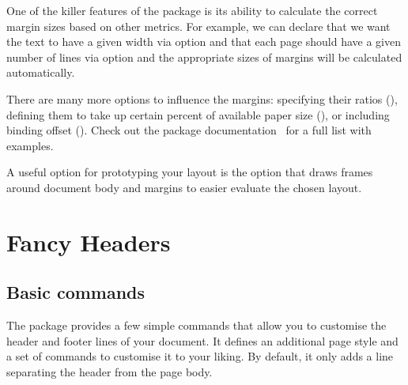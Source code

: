 One of the killer features of the  package is its ability to
calculate the correct margin sizes based on other metrics. For example, we can
declare that we want the text to have a given width via 
option and that each page should have a given number of lines via 
option and the appropriate sizes of margins will be calculated automatically.
There are many more options to influence the margins: specifying their ratios
(), defining them to take up certain percent of available paper
size (), or including binding offset ().
Check out the package documentation~\cite{pack:geometry} for a full list with
examples.

A useful option for prototyping your layout is the  option
that draws frames around document body and margins to easier evaluate the
chosen layout.
\endgroup
\section{Fancy Headers}\label{sec:fancy}

\subsection{Basic commands}

The  package provides a few simple commands that allow you to
customise the header and footer lines of your document. It defines an
additional page style  and a set of commands to customise it to
your liking. By default, it only adds a line separating the header from the page
body.

